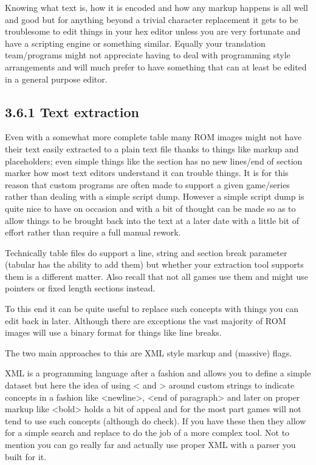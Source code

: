 \documentclass[
]{book}
\begin{document}
Knowing what text is, how it is encoded and how any markup happens is all well and good but for anything beyond a trivial character replacement it gets to be troublesome to edit things in your hex editor unless you are very fortunate and have a scripting engine or something similar. Equally your translation team/programs might not appreciate having to deal with programming style arrangements and will much prefer to have something that can at least be edited in a general purpose editor.

\hypertarget{text-extraction}{%
\subsection{3.6.1 Text extraction}\label{text-extraction}}

Even with a somewhat more complete table many ROM images might not have their text easily extracted to a plain text file thanks to things like markup and placeholders; even simple things like the section has no new lines/end of section marker how most text editors understand it can trouble things. It is for this reason that custom programs are often made to support a given game/series rather than dealing with a simple script dump. However a simple script dump is quite nice to have on occasion and with a bit of thought can be made so as to allow things to be brought back into the text at a later date with a little bit of effort rather than require a full manual rework.

Technically table files do support a line, string and section break parameter (tabular has the ability to add them) but whether your extraction tool supports them is a different matter. Also recall that not all games use them and might use pointers or fixed length sections instead.

To this end it can be quite useful to replace such concepts with things you can edit back in later. Although there are exceptions the vast majority of ROM images will use a binary format for things like line breaks.

The two main approaches to this are XML style markup and (massive) flags.

XML is a programming language after a fashion and allows you to define a simple dataset but here the idea of using \textless{} and \textgreater{} around custom strings to indicate concepts in a fashion like \textless newline\textgreater, \textless end of paragraph\textgreater{} and later on proper markup like \textless bold\textgreater{} holds a bit of appeal and for the most part games will not tend to use such concepts (although do check). If you have these then they allow for a simple search and replace to do the job of a more complex tool. Not to mention you can go really far and actually use proper XML with a parser you built for it.
\end{document}
